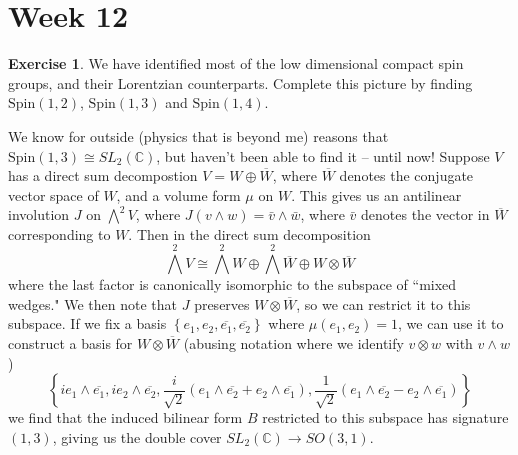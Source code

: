 \documentclass[psamsfonts]{amsart}
\theoremstyle{definition}
\newtheorem{exer}[thm]{Exercise}
\theoremstyle{remark}
\newcommand{\C}{\mathbb{C}}
\newcommand{\Spin}{\mathrm{Spin}}
\newcommand{\set}[1]{\left\lbrace #1 \right\rbrace}
\begin{document}
\section*{Week 12}
%
\begin{exer}
We have identified most of the low dimensional compact spin groups, and their Lorentzian counterparts. Complete this picture by finding $\Spin(1,2)$, $\Spin(1,3)$ and $\Spin(1,4)$.
\end{exer}
We know for outside (physics that is beyond me) reasons that $\Spin(1,3) \cong SL_2(\C)$, but haven't been able to find it -- until now! Suppose $V$ has a direct sum decompostion $V = W \oplus \overline{W}$, where $\overline{W}$ denotes the conjugate vector space of $W$, and a volume form $\mu$ on $W$. This gives us an antilinear involution $J$ on $\bigwedge^2V$, where $J(v \wedge w) = \bar{v} \wedge \bar{w}$, where $\bar{v}$ denotes the vector in $\overline{W}$ corresponding to $W$. Then in the direct sum decomposition
$$\bigwedge^2 V \cong \bigwedge^2W \oplus \bigwedge^2 \overline{W} \oplus W \otimes \overline{W} $$
where the last factor is canonically isomorphic to the subspace of ``mixed wedges." We then note that $J$ preserves $W \otimes \overline{W}$, so we can restrict it to this subspace. If we fix a basis $\set{e_1, e_2, \overline{e_1}, \overline{e_2}}$ where $\mu(e_1,e_2) = 1$, we can use it to construct a basis for $W \otimes \overline{W}$ (abusing notation where we identify $v \otimes w$ with $v \wedge w$)
$$\set{ie_1 \wedge \overline{e_1}, ie_2 \wedge \overline{e_2}, \frac{i}{\sqrt{2}}(e_1 \wedge \overline{e_2} + e_2 \wedge \overline{e_1}), \frac{1}{\sqrt{2}}(e_1 \wedge \overline{e_2} - e_2 \wedge \overline{e_1}) } $$
we find that the induced bilinear form $B$ restricted to this subspace has signature $(1,3)$, giving us the double cover $SL_2(\C) \to SO(3,1)$.
\end{document}

